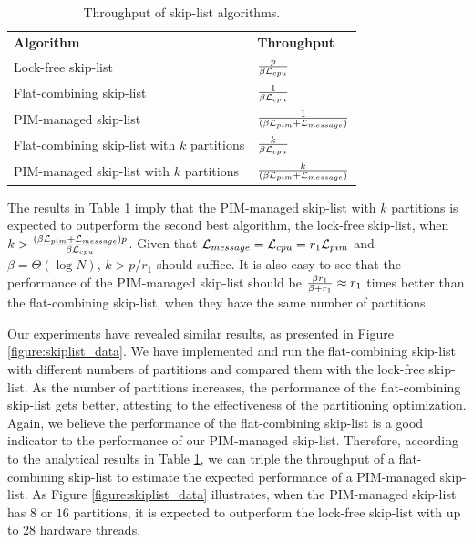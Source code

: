 \begin{table}[ht!]
\begin{center}
	\begin{tabular}{| >{\small}l | l |}
    \hline
    \textbf{Algorithm} & \textbf{Throughput} \\ \hhline{|=|=|} 
    Lock-free skip-list & ${p \over \beta\mathcal{L}_{cpu}}$ \\ \hline
    Flat-combining skip-list & ${1 \over \beta\mathcal{L}_{cpu}}$ \\ \hline
    PIM-managed skip-list & ${1 \over (\beta\mathcal{L}_{pim} + \mathcal{L}_{message})}$ \\ \hline
    Flat-combining skip-list with $k$ partitions & ${k \over \beta\mathcal{L}_{cpu}}$ \\ \hline
    PIM-managed skip-list with $k$ partitions & ${k \over (\beta\mathcal{L}_{pim} + \mathcal{L}_{message})}$ \\ \hline
    \end{tabular}
\end{center}
\caption{Throughput of skip-list algorithms.}
\label{tab:skiplist}
\end{table}

The results in Table \ref{tab:skiplist} imply that 
the PIM-managed skip-list with $k$ partitions is expected to outperform the second best algorithm, 
the lock-free skip-list, when $k > {(\beta\mathcal{L}_{pim} + \mathcal{L}_{message})p \over \beta\mathcal{L}_{cpu}}$.
Given that $\mathcal{L}_{message} = \mathcal{L}_{cpu} = r_1\mathcal{L}_{pim}$ and $\beta = \Theta(\log N)$, $k > p/r_1$ should suffice.
It is also easy to see that the performance of the PIM-managed skip-list should be 
${\beta r_1 \over \beta + r_1} \approx r_1$ times better than the flat-combining skip-list, 
when they have the same number of partitions. 

Our experiments have revealed similar results, 
as presented in Figure \ref{figure:skiplist_data}.
We have implemented and run the flat-combining skip-list with different numbers of
partitions and compared them with the lock-free skip-list.
As the number of partitions increases, the performance of the flat-combining skip-list
gets better, attesting to the effectiveness of the partitioning optimization.
Again, we believe the performance of the flat-combining skip-list is a good indicator
to the performance of our PIM-managed skip-list.
Therefore, according to the analytical results in Table \ref{tab:skiplist}, we can triple the throughput 
of a flat-combining skip-list to estimate the expected performance of a PIM-managed skip-list.
As Figure \ref{figure:skiplist_data} illustrates, when the PIM-managed skip-list has $8$ or $16$ 
partitions, it is expected to outperform the lock-free skip-list with up to 28 hardware threads.

